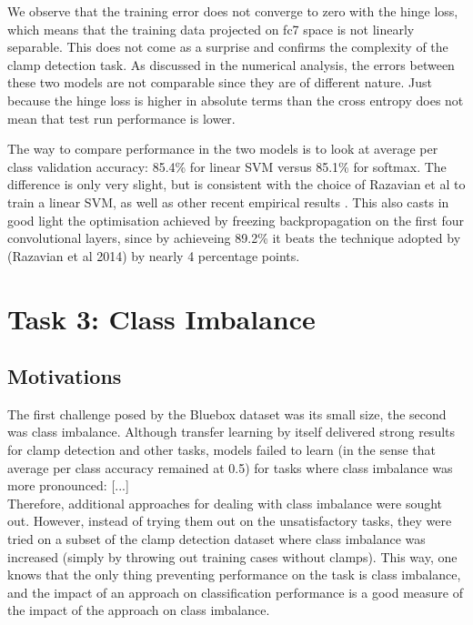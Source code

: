 \documentclass[a4paper,11pt]{article}
\begin{document}
We observe that the training error does not converge to zero with the hinge loss, which means that the training data projected on fc7 space is not linearly separable. This does not come as a surprise and confirms the complexity of the clamp detection task. As discussed in the numerical analysis, the errors between these two models are not comparable since they are of different nature. Just because the hinge loss is higher in absolute terms than the cross entropy does not mean that test run performance is lower. 

The way to compare performance in the two models is to look at average per class validation accuracy: 85.4\% for linear SVM versus 85.1\% for softmax. The difference is only very slight, but is consistent with the choice of Razavian et al to train a linear SVM, as well as other recent empirical results \cite{svm-nn}. This also casts in good light the optimisation achieved by freezing backpropagation on the first four convolutional layers, since by achieveing 89.2\% it beats the technique adopted by (Razavian et al 2014) by nearly 4 percentage points.


\clearpage
\section{Task 3: Class Imbalance}

\subsection{Motivations}

The first challenge posed by the Bluebox dataset was its small size, the second was class imbalance. Although transfer learning by itself delivered strong results for clamp detection and other tasks, models failed to learn (in the sense that average per class accuracy remained at 0.5) for tasks where class imbalance was more pronounced: [...] \\

Therefore, additional approaches for dealing with class imbalance were sought out. However, instead of trying them out on the unsatisfactory tasks, they were tried on a subset of the clamp detection dataset where class imbalance was increased (simply by throwing out training cases without clamps). This way, one knows that the only thing preventing performance on the task is class imbalance, and the impact of an approach on classification performance is a good measure of the impact of the approach on class imbalance. \\
\end{document}

